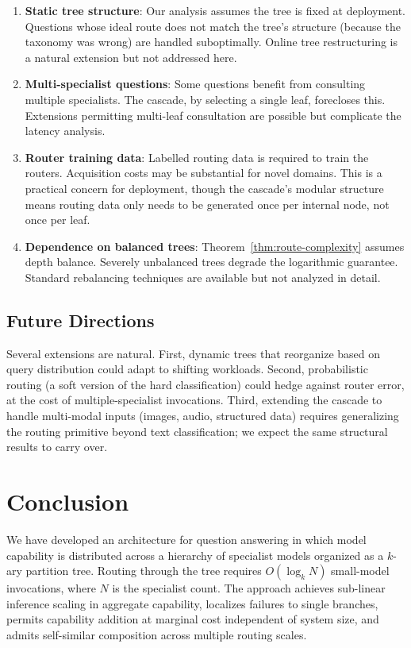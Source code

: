 \documentclass[11pt,twocolumn,a4paper]{article}
\theoremstyle{definition}
\theoremstyle{remark}
\begin{document}
\begin{enumerate}
    \item \textbf{Static tree structure}: Our analysis assumes the tree is fixed at deployment. Questions whose ideal route does not match the tree's structure (because the taxonomy was wrong) are handled suboptimally. Online tree restructuring is a natural extension but not addressed here.

    \item \textbf{Multi-specialist questions}: Some questions benefit from consulting multiple specialists. The cascade, by selecting a single leaf, forecloses this. Extensions permitting multi-leaf consultation are possible but complicate the latency analysis.

    \item \textbf{Router training data}: Labelled routing data is required to train the routers. Acquisition costs may be substantial for novel domains. This is a practical concern for deployment, though the cascade's modular structure means routing data only needs to be generated once per internal node, not once per leaf.

    \item \textbf{Dependence on balanced trees}: Theorem~\ref{thm:route-complexity} assumes depth balance. Severely unbalanced trees degrade the logarithmic guarantee. Standard rebalancing techniques are available but not analyzed in detail.
\end{enumerate}

\subsection{Future Directions}

Several extensions are natural. First, dynamic trees that reorganize based on query distribution could adapt to shifting workloads. Second, probabilistic routing (a soft version of the hard classification) could hedge against router error, at the cost of multiple-specialist invocations. Third, extending the cascade to handle multi-modal inputs (images, audio, structured data) requires generalizing the routing primitive beyond text classification; we expect the same structural results to carry over.

\section{Conclusion}
\label{sec:conclusion}

We have developed an architecture for question answering in which model capability is distributed across a hierarchy of specialist models organized as a $k$-ary partition tree. Routing through the tree requires $O(\log_k N)$ small-model invocations, where $N$ is the specialist count. The approach achieves sub-linear inference scaling in aggregate capability, localizes failures to single branches, permits capability addition at marginal cost independent of system size, and admits self-similar composition across multiple routing scales.
\end{document}
